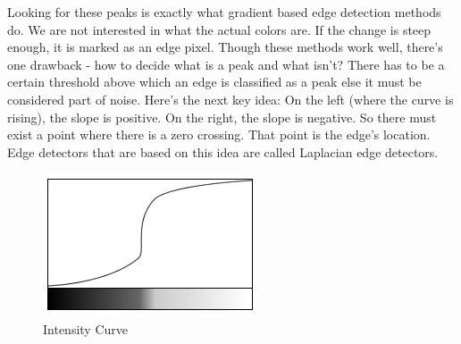 \documentclass[BTech]{srmuthesis}
\begin{document}
Looking for these peaks is exactly what gradient based edge detection methods do. We are not interested in what the actual colors are. If the change is steep enough, it is marked as an edge pixel. Though these methods work well, there's one drawback - how to decide what is a peak and what isn't? There has to be a certain threshold above which an edge is classified as a peak else it must be considered part of noise. Here's the next key idea: On the left (where the curve is rising), the slope is positive. On the right, the slope is negative. So there must exist a point where there is a zero crossing. That point is the edge's location. Edge detectors that are based on this idea are called Laplacian edge detectors.

\begin{figure}[h!]
    \centering
    \includegraphics[width=10cm\textwidth]{intensity-curve}
    \caption{Intensity Curve}
    \label{fig:Intensity curve}
\end{figure}
\end{document}
